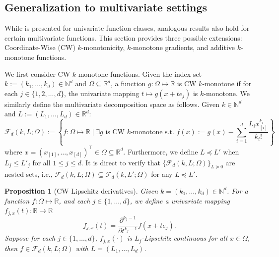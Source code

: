 \documentclass[12pt]{article}
\newtheorem{proposition}[theorem]{Proposition}
\begin{document}
\subsection{Generalization to multivariate settings}\label{subsec:multi-variate}

While  is presented for univariate function classes, analogous results also hold for certain multivariate functions. This section provides three possible extensions: Coordinate-Wise (CW) $k$-monotonicity, $k$-monotone gradients, and additive $k$-monotone functions. 

We first consider CW $k$-monotone functions. Given the index set $k:= (k_1, \ldots, k_d)\in \mathbb{N}^d$ and $\Omega \subseteq \mathbb{R}^d$, a function $g : \Omega \mapsto \mathbb{R}$ is CW $k$-monotone if for each $j \in \{1, 2, \ldots, d\}$, the univariate mapping $t \mapsto g(x + te_j)$ is $k$-monotone. We similarly define the multivariate decomposition space as follows.
Given $k\in\mathbb{N}^d$ and  $L :=(L_1, \ldots, L_d)\in \mathbb{R}^d$:
\begin{equation*}
\mathcal{F}_d(k, L;\Omega):=\left\{f : \Omega \mapsto\mathbb{R}\mid  \exists g \text { is CW } k \text {-monotone s.t. } f(x):=g(x)-\sum_{i=1}^d \frac{L_i x_{[i]}^{k_i}}{k_{i}!}\right\}
\end{equation*}
where $x=(x_{[1]},\ldots, x_{[d]})^\top\in \Omega \subseteq \mathbb{R}^d$. Furthermore, we define $L \preceq L'$ when $L_{j} \le L'_j$ for all $1 \le j \le d$. It is direct to verify that $\{\mathcal{F}_d(k, L; \Omega)\}_{L \succeq 0}$ are nested sets, i.e., $\mathcal{F}_d(k, L; \Omega) \subseteq \mathcal{F}_d(k, L'; \Omega)$ for any $L \preceq L'$. 

\begin{proposition}[CW Lipschitz derivatives]\label{prop:coordinate-deriv}
Given $k = (k_1,\ldots,k_d)\in\mathbb{N}^d$. For a function $f: \Omega \mapsto \mathbb R$, and each $j \in \{1,\ldots,d\}$, we define a univariate mapping $f_{j,x}(t):\mathbb{R}\rightarrow\mathbb{R}$
    \begin{equation*}
        f_{j,x}(t) =  \frac{\partial^{k_j-1}}{\partial t^{k_j-1}}f(x+t e_j).
    \end{equation*}
    Suppose for each $j \in \{1,\ldots,d\}$, $f_{j, x}(\cdot)$ is $L_j$-Lipschitz continuous for all $x\in\Omega$, then $f\in\mathcal{F}_d(k, L; \Omega)$ with $L = (L_1,\ldots,L_d)$.
\end{proposition}
\end{document}
